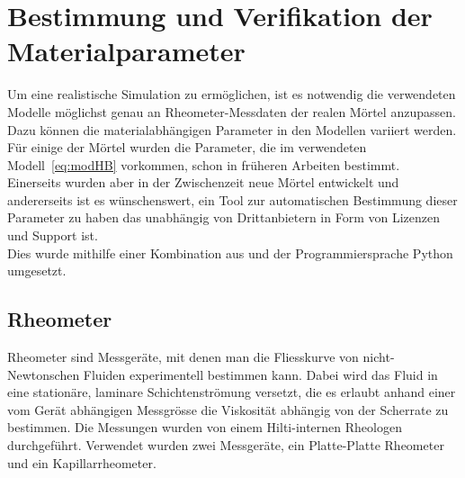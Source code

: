 \section{Bestimmung und Verifikation der Materialparameter}
\label{Kapitel:Parameter}
Um eine realistische Simulation zu ermöglichen, ist es notwendig die verwendeten Modelle möglichst genau an Rheometer-Messdaten der realen Mörtel anzupassen. Dazu können die materialabhängigen Parameter in den Modellen variiert werden.\\
Für einige der Mörtel wurden die Parameter, die im verwendeten Modell~\eqref{eq:modHB} vorkommen, schon in früheren Arbeiten bestimmt. \\
Einerseits wurden aber in der Zwischenzeit neue Mörtel entwickelt und andererseits ist es wünschenswert, ein Tool zur automatischen Bestimmung dieser Parameter zu haben das unabhängig von Drittanbietern in Form von Lizenzen und Support ist. \\
Dies wurde mithilfe einer Kombination aus \openfoam{} und der Programmiersprache Python umgesetzt.
%
\subsection{Rheometer}
Rheometer sind Messgeräte, mit denen man die Fliesskurve von nicht-Newtonschen Fluiden experimentell bestimmen kann.
Dabei wird das Fluid in eine stationäre, laminare Schichtenströmung versetzt, die es erlaubt anhand einer vom Gerät abhängigen Messgrösse die Viskosität abhängig von der Scherrate zu bestimmen.
Die Messungen wurden von einem Hilti-internen Rheologen durchgeführt. Verwendet wurden zwei Messgeräte, ein Platte-Platte Rheometer und ein Kapillarrheometer.
%
